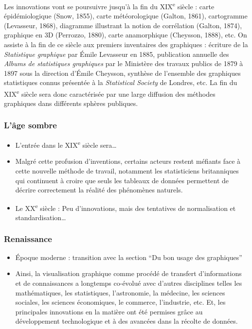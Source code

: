\documentclass[]{article}
\providecommand{\tightlist}{%
  \setlength{\itemsep}{0pt}\setlength{\parskip}{0pt}}
\begin{document}
Les innovations vont se poursuivre jusqu'à la fin du XIX\textsuperscript{e} siècle : carte épidémiologique (Snow, 1855), carte météorologique (Galton, 1861), cartogramme (Levasseur, 1868), diagramme illustrant la notion de corrélation (Galton, 1874), graphique en 3D (Perrozzo, 1880), carte anamorphique (Cheysson, 1888), etc. On assiste à la fin de ce siècle aux premiers inventaires des graphiques : écriture de la \emph{Statistique graphique} par Émile Levasseur en 1885, publication annuelle des \emph{Albums de statistiques graphiques} par le Ministère des travaux publics de 1879 à 1897 sous la direction d'Émile Cheysson, synthèse de l'ensemble des graphiques statistiques connus présentée à la \emph{Statistical Society} de Londres, etc. La fin du XIX\textsuperscript{e} siècle sera donc caractérisée par une large diffusion des méthodes graphiques dans différents sphères publiques.

\hypertarget{lage-sombre}{%
\subsubsection{L'âge sombre}\label{lage-sombre}}

\begin{itemize}
\tightlist
\item
  L'entrée dans le XIX\textsuperscript{e} siècle sera\ldots{}
\item
  Malgré cette profusion d'inventions, certains acteurs restent méfiants face à cette nouvelle méthode de travail, notamment les statisticiens britanniques qui continuent à croire que seuls les tableaux de données permettent de décrire correctement la réalité des phénomènes naturels.
\item
  Le XX\textsuperscript{e} siècle : Peu d'innovations, mais des tentatives de normalisation et standardisation\ldots{}
\end{itemize}

\hypertarget{renaissance}{%
\subsubsection{Renaissance}\label{renaissance}}

\begin{itemize}
\tightlist
\item
  Époque moderne : transition avec la section ``Du bon usage des graphiques''
\item
  Ainsi, la visualisation graphique comme procédé de transfert d'informations et de connaissances a longtemps co-évolué avec d'autres disciplines telles les mathématiques, les statistiques, l'astronomie, la médecine, les sciences sociales, les sciences économiques, le commerce, l'industrie, etc. Et, les principales innovations en la matière ont été permises grâce au développement technologique et à des avancées dans la récolte de données.
\end{itemize}
\end{document}
